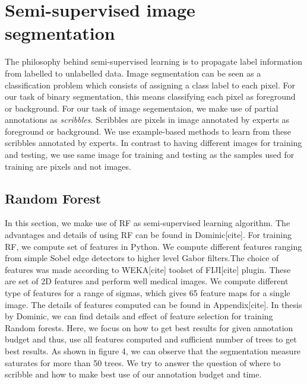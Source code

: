 %
\newpage
\chapter{Semi-supervised image segmentation}
The philosophy behind semi-supervised learning is to propagate label information from labelled to unlabelled data. Image segmentation can be seen as a classification problem which consists of assigning a class label to each pixel. For our task of binary segmentation, this means classifying each pixel as foreground or background. For our task of image segementaion, we make use of partial annotations as \textit{scribbles}. Scribbles are pixels in image annotated by experts as foreground or background. We use example-based methods to learn from these scribbles annotated by experts. In contrast to having different images for training and testing, we use same image for training and testing as the samples used for training are pixels and not images.

\section{Random Forest}
In this section, we make use of RF as semi-supervised learning algorithm. The advantages and details of using RF can be found in Dominic[cite]. For training RF, we compute set  of features in Python. We compute different features ranging from simple Sobel edge detectors to higher level Gabor filters.The choice of features was made according to WEKA[cite] toolset of FIJI[cite] plugin. These are set of 2D features and perform well medical images. We compute different type of features for a range of sigmas, which gives 65 feature maps for a single image. The details of features computed can be found in Appendix[cite]. In thesis by Dominic, we can find details and effect of feature selection for training Random forests. Here, we focus on how to get best results for given annotation budget and thus, use all features computed and sufficient number of trees to get best results. As shown in figure 4, we can observe that the segmentation measure saturates for more than 50 trees. We try to answer the question of where to scribble and how to make best use of our annotation budget and time.

